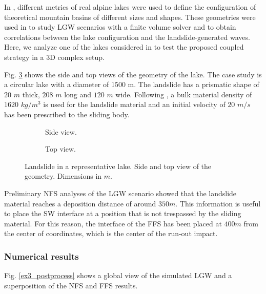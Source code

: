 In \cite{app112411614}, different metrics of real alpine lakes were used to define the configuration of theoretical mountain basins of different sizes and shapes. These geometries were used in \cite{app112411614} to study LGW scenarios with a finite volume solver and to obtain correlations between the lake configuration and the landslide-generated waves. Here, we analyze one of the lakes considered in \cite{app112411614} to test the proposed coupled strategy in a 3D complex setup. 

Fig. \ref{lake_geometry} shows the side and top views of the geometry of the lake. 
The case study is a circular lake with a diameter of 1500 m. The landslide has a prismatic shape of $20$ $m$ thick, $208$ $m$ long and $120$ $m$ wide. Following \cite{app112411614}, a bulk material density of $1620$ $kg/m ^3$ is used for the landslide material and an initial velocity of $20$ $m/s$ has been prescribed to the sliding body.

\begin{figure}[ht]
    \centering
    \begin{subfigure}{0.6\textwidth}
        \caption{Side view.}
        \label{ex3_lateralview}
    \end{subfigure}
    \par\medskip
    \begin{subfigure}{0.75\textwidth}
        \caption{Top view.}
        \label{ex3_topview}
    \end{subfigure}
    \caption{Landslide in a representative lake. Side and top view of the geometry. Dimensions in $m$.}
    \label{lake_geometry}
\end{figure}



Preliminary NFS analyses of the LGW scenario showed that the landslide material reaches a deposition distance of around $350m$. This information is useful to place the SW interface at a position that is not trespassed by the sliding material. For this reason, the interface of the FFS has been placed at $400m$ from the center of coordinates, which is the center of the run-out impact. 


\subsubsection{Numerical results}

Fig. \ref{ex3_postprocess} shows a global view of the simulated LGW and a superposition of the NFS and FFS results.


